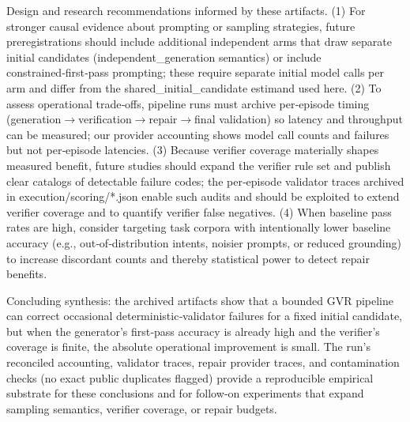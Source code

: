 \documentclass[conference]{IEEEtran}
\begin{document}
Design and research recommendations informed by these artifacts. (1) For stronger causal evidence about prompting or sampling strategies, future preregistrations should include additional independent arms that draw separate initial candidates (independent\_generation semantics) or include constrained‑first‑pass prompting; these require separate initial model calls per arm and differ from the shared\_initial\_candidate estimand used here. (2) To assess operational trade‑offs, pipeline runs must archive per‑episode timing (generation\ensuremath{\rightarrow}verification\ensuremath{\rightarrow}repair\ensuremath{\rightarrow}final validation) so latency and throughput can be measured; our provider accounting shows model call counts and failures but not per‑episode latencies. (3) Because verifier coverage materially shapes measured benefit, future studies should expand the verifier rule set and publish clear catalogs of detectable failure codes; the per‑episode validator traces archived in execution/scoring/*.json enable such audits and should be exploited to extend verifier coverage and to quantify verifier false negatives. (4) When baseline pass rates are high, consider targeting task corpora with intentionally lower baseline accuracy (e.g., out‑of‑distribution intents, noisier prompts, or reduced grounding) to increase discordant counts and thereby statistical power to detect repair benefits.

Concluding synthesis: the archived artifacts show that a bounded GVR pipeline can correct occasional deterministic‑validator failures for a fixed initial candidate, but when the generator's first‑pass accuracy is already high and the verifier's coverage is finite, the absolute operational improvement is small. The run's reconciled accounting, validator traces, repair provider traces, and contamination checks (no exact public duplicates flagged) provide a reproducible empirical substrate for these conclusions and for follow‑on experiments that expand sampling semantics, verifier coverage, or repair budgets.
\end{document}
